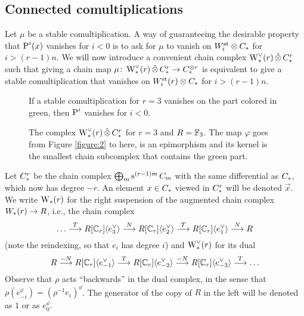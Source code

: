 \subsection{Connected comultiplications}\label{s:connected} Let $\mu$ be a stable comultiplication. A way of guaranteeing the desirable property that $\power^i(x)$ vanishes for $i<0$ is to ask for $\mu$ to vanish on $\Wst[i]\otimes \ucadenas$ for $i>(r-1)n$.
We will now introduce a convenient chain complex $\rWd(r)\hotimes \rucadenas$ such that giving a chain map $\mu\colon \rWd(r)\hotimes \rucadenas\to \ucadenas^{\otimes r}$ is equivalent to give a stable comultiplication that vanishes on $\Wst[i](r)\otimes \ucadenas$ for $i>(r-1)n$.
\begin{figure}


\caption{If a stable comultiplication for $r=3$ vanishes on the part colored in green, then $\power^i$ vanishes for $i<0$.}
\label{figure:2}


\caption{The complex $\rWd(r)\hotimes \rucadenas$ for $r=3$ and $R=\bF_3$. The map $\varphi$ goes from Figure \ref{figure:2} to here, is an epimorphism and its kernel is the smallest chain subcomplex that contains the green part.}
\label{figure:3}

\end{figure}
Let $\rucadenas$ be the chain complex $\bigoplus_m \sus{(r-1)m}\ucadenas[m]$ with the same differential as $\ucadenas$, which now has degree $-r$. An element $x\in \ucadenas$ viewed in $\rucadenas$ will be denoted $\vec{x}$. We write $\rW(r)$ for the right suspension of the augmented chain complex $\W(r)\to R$, i.e., the chain complex
\[
\ldots
\overset{T}{\lra} 
R[\Cyc_r]\langle e_{3}^\dd\rangle 
\overset{N}{\lra} 
R[\Cyc_r]\langle e_{2}^\dd\rangle 
\overset{T}{\lra} 
R[\Cyc_r]\langle e_{1}^\dd\rangle 
\overset{N}{\lra} 
R
\]
(note the reindexing, so that $e_i$ has degree $i$) and $\rWd(r)$ for its dual 
\[
R\overset{-N}{\lra} R[\Cyc_r]\langle e_{-1}^\dd\rangle \overset{T}{\lra} R[\Cyc_r]\langle e_{-2}^\dd\rangle \overset{-N}{\lra} R[\Cyc_r]\langle e_{-3}^\dd\rangle \overset{T}{\lra} \ldots
\]
Observe that $\rho$ acts ``backwards'' in the dual complex, in the sense that $\rho (e_{-i}^\dd) = (\rho^{-1} e_i)^{\dd}$. The generator of the copy of $R$ in the left will be denoted as $1$ or as $e_0^\dd$.

